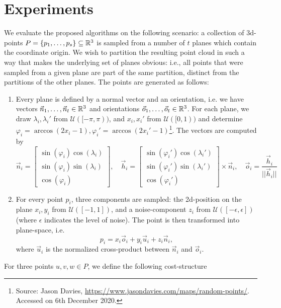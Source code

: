 \section{Experiments}
We evaluate the proposed algorithms on the following scenario: a collection of 3d-points $P = \{ p_1,\dots,p_s \} \subseteq \mathbb{R}^3$ is sampled from a number of $t$ planes which contain the coordinate origin. We wish to partition the resulting point cloud in such a way that makes the underlying set of planes obvious: i.e., all points that were sampled from a given plane are part of the same partition, distinct from the partitions of the other planes. The points are generated as follows:
\begin{enumerate}
    \item Every plane is defined by a normal vector and an orientation, i.e. we have vectors $\vec{n}_1,\dots,\vec{n}_t \in \mathbb{R}^3$ and orientations $\vec{o}_1,\dots,\vec{o}_t \in \mathbb{R}^3$. For each plane, we draw $\lambda_i,\lambda_i'$ from $\mathcal{U}([-\pi,\pi))$, and $x_i,x_i'$ from $\mathcal{U}([0,1))$ and determine $\varphi_i = \arccos(2x_i-1), \varphi_i' = \arccos(2x_i'-1)$\footnote{Source: Jason Davies, \href{https://www.jasondavies.com/maps/random-points/}{https://www.jasondavies.com/maps/random-points/}. Accessed on 6th December 2020.}. The vectors are computed by $$ \vec{n}_i = \begin{bmatrix} \sin(\varphi_i) \cos(\lambda_i) \\ \sin(\varphi_i)\sin(\lambda_i) \\ \cos(\varphi_i) \end{bmatrix},\quad \vec{h}_i = \begin{bmatrix} \sin(\varphi_i') \cos(\lambda_i') \\ \sin(\varphi_i')\sin(\lambda_i') \\ \cos(\varphi_i') \end{bmatrix} \times \vec{n}_i,\quad \vec{o}_i = \frac{\vec{h}_i}{||\vec{h}_i||} $$
    \item For every point $p_i$, three components are sampled: the 2d-position on the plane $x_i,y_i$ from $\mathcal{U}([-1,1])$, and a noise-component $z_i$ from $\mathcal{U}([-\epsilon,\epsilon])$ (where $\epsilon$ indicates the level of noise). The point is then transformed into plane-space, i.e. $$ p_i = x_i \vec{o}_i + y_i \vec{u}_i + z_i \vec{n}_i, $$ where $\vec{u}_i$ is the normalized cross-product between $\vec{n}_i$ and $\vec{o}_i$.
\end{enumerate}
For three points $u,v,w \in P$, we define the following cost-structure
